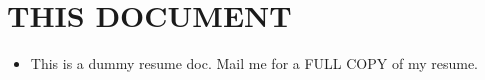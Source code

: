 \documentclass[11pt,a4paper]{moderncv}
\begin{document}
\maketitle
\vspace{-1cm}

\section*{THIS DOCUMENT}
\begin{itemize}
\setlength\itemsep{0.5em}
\item This is a dummy resume doc. Mail me for a FULL COPY of my resume.
\end{itemize}
\end{document}
